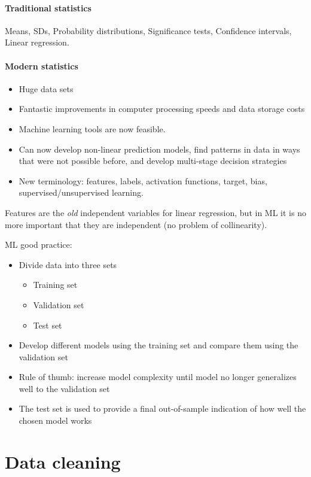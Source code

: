 \paragraph{Traditional statistics} Means, SDs, Probability distributions, Significance tests, Confidence intervals, Linear regression.

\paragraph{Modern statistics}
\begin{itemize}
    \item Huge data sets 
    \item Fantastic improvements in computer processing speeds and data storage costs
    \item Machine learning tools are now feasible.
    \item Can now develop non-linear prediction models, find patterns in data in ways that were not possible before, and develop multi-stage decision strategies
    \item New terminology: features, labels, activation functions, target, bias, supervised/unsupervised learning.
\end{itemize}

Features are the \textit{old} independent variables for linear regression, but in ML it is no more important that they are independent (no problem of collinearity).

ML good practice:
\begin{itemize}
    \item Divide data into three sets
    \begin{itemize}
        \item Training set
        \item Validation set
        \item Test set
    \end{itemize}
    \item Develop different models using the training set and compare them using the validation set
    \item Rule of thumb: increase model complexity until model no longer generalizes well to the validation set
    \item The test set is used to provide a final out-of-sample indication of how well the chosen model works
\end{itemize}

\section{Data cleaning}

